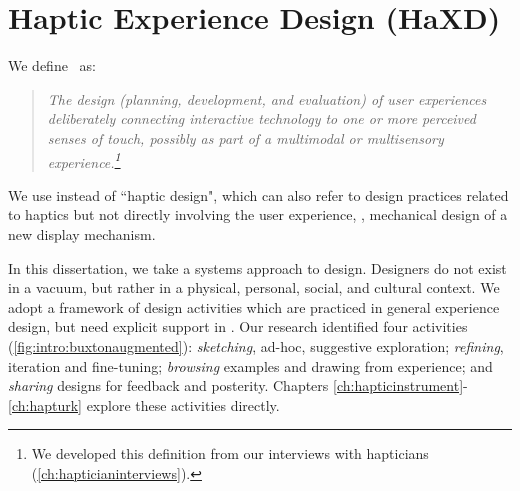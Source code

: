 \section{Haptic Experience Design (HaXD)}
We define \haxd\ as: %
\begin{quote}
\it The design (planning, development, and evaluation) of user experiences  deliberately connecting interactive technology to
one or more perceived senses of touch, possibly as part of a multimodal or multisensory experience.\footnote{We developed this definition from our interviews with hapticians (\autoref{ch:hapticianinterviews}).}
\end{quote}
We use \haxd instead of ``haptic design", which can also refer to design practices related to haptics but not directly involving the user experience, \eg, mechanical design of a new display mechanism. %

 

In this dissertation, we take a systems approach to design.
Designers do not exist in a vacuum, but rather in a physical, personal, social, and cultural context. %
We adopt a framework of design activities which are practiced in general experience design, but need explicit support in \haxd.
Our research identified four activities (\autoref{fig:intro:buxtonaugmented}): \emph{sketching}, ad-hoc, suggestive exploration; \emph{refining}, iteration and fine-tuning; \emph{browsing} examples and drawing from experience; and \emph{sharing} designs for feedback and posterity.
Chapters \ref{ch:hapticinstrument}-\ref{ch:hapturk} explore these activities directly. %





